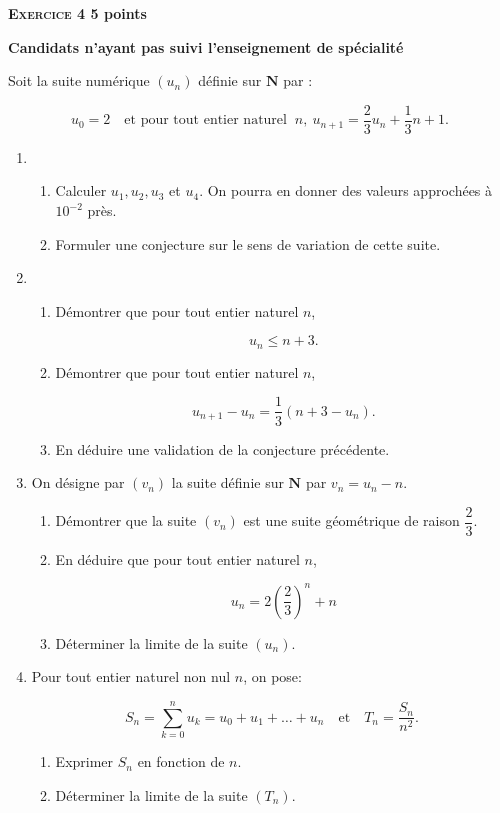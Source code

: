 \documentclass[10pt]{article}
\begin{document}
\newpage

\textbf{\textsc{Exercice 4} \hfill 5 points}
 
\textbf{Candidats n'ayant pas suivi l'enseignement de spécialité }

\medskip

Soit la suite numérique $\left(u_{n}\right)$ définie sur $\textbf{N}$ par : 

\[u_{0} = 2 \quad \text{et pour tout entier naturel } \:n, \:u_{n+1} = \dfrac{2}{3}u_{n} + \dfrac{1}{3}n + 1.\]
 
\begin{enumerate}
\item 
	\begin{enumerate}
		\item Calculer $u_{1}, u_{2}, u_{3}$ et $u_{4}$. On pourra en donner des valeurs approchées à $10^{- 2}$ près. 
		\item Formuler une conjecture sur le sens de variation de cette suite.
	\end{enumerate} 

\item 
	\begin{enumerate}
		\item Démontrer que pour tout entier naturel $n$, 

\[u_{n} \leqslant n + 3.\]
 
		\item Démontrer que pour tout entier naturel $n$, 
 
\[u_{n+1} - u_{n} = \dfrac{1}{3} \left(n + 3 - u_{n}\right).\]
 
		\item En déduire une validation de la conjecture précédente.
	\end{enumerate} 	
\item On désigne par $\left(v_{n}\right)$ la suite définie sur $\textbf{N}$ par $v_{n} = u_{n} - n$. 
	\begin{enumerate}
		\item Démontrer que la suite $\left(v_{n}\right)$ est une suite géométrique de raison $\dfrac{2}{3}$. 
		\item En déduire que pour tout entier naturel $n$,
		
		\[u_{n} = 2\left(\dfrac{2}{3} \right)^n + n\]
		 
		\item Déterminer la limite de la suite $\left(u_{n}\right)$.
	\end{enumerate} 	
\item Pour tout entier naturel non nul $n$, on pose: 
 
\[S_{n} = \sum_{k=0}^n u_{k} = u_{0} + u_{1} + \ldots + u_{n}\quad \text{et}  
\quad T_{n} = \dfrac{S_{n}}{n^2}.\]

	\begin{enumerate}
		\item Exprimer $S_{n}$ en fonction de $n$. 
		\item Déterminer la limite de la suite $\left(T_{n}\right)$.
	\end{enumerate} 
\end{enumerate}
\end{document}
